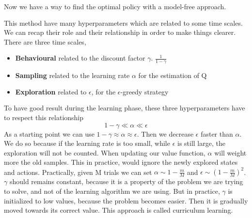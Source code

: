 \documentclass[../main.tex]{subfiles}
\begin{document}
Now we have a way to find the optimal policy with a model-free approach.
\par\noindent
This method have many hyperparameters which are related to some time scales. We can recap their role and their relationship in order to make things clearer. There are three time scales,
\begin{itemize}
    \item \textbf{Behavioural} related to the discount factor $\gamma$. $\frac{1}{1-\gamma}$
    \item \textbf{Sampling} related to the learning rate $\alpha$ for the estimation of Q
    \item \textbf{Exploration} related to $\epsilon$, for the $\epsilon$-greedy strategy
\end{itemize}
To have good result during the learning phase, these three hyperparameters have to respect this relationship
\begin{equation*}
    1-\gamma \ll \alpha \ll \epsilon
\end{equation*}
As a starting point we can use $1-\gamma \approx \alpha \approx \epsilon$. Then we decrease $\epsilon$ faster than $\alpha$. We do so because if the learning rate is too small, while $\epsilon$ is still large, the exploration will not be counted. When updating our value function, $\alpha$ will weight more the old samples. This in practice, would ignore the newly explored states and actions.
Practically, given M trials we can set $\alpha \sim 1- \frac{m}{M}$ and $\epsilon \sim (1-\frac{m}{M})^2$. $\gamma$ should remains constant, because it is a property of the problem we are trying to solve, and not of the learning algorithm we are using. But in practice, $\gamma$ is initialized to low values, because the problem becomes easier. Then it is gradually moved towards its correct value. This approach is called curriculum learning.
\end{document}
